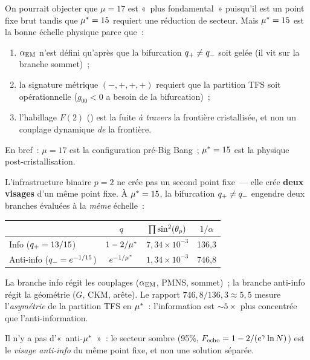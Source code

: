 \documentclass[12pt,a4paper]{article}
\begin{document}
\begin{remarque}[Pourquoi $\mustar = 15$ est le point fixe physique]
\label{rem:why_15}
On pourrait objecter que $\mu = 17$ est «~plus fondamental~» puisqu'il
est un point fixe brut tandis que $\mustar = 15$ requiert une
réduction de secteur. Mais $\mustar = 15$ est la bonne échelle
physique parce que~:
\begin{enumerate}[nosep]
\item $\alpha_{\mathrm{EM}}$ n'est défini qu'après que la bifurcation
  $q_{+} \neq q_{-}$ soit gelée (il vit sur la branche sommet)~;
\item la signature métrique $(-,+,+,+)$ requiert que la partition
  TFS soit opérationnelle ($g_{00} < 0$ a besoin de la bifurcation)~;
\item l'habillage $F(2)$ (\cite{companion_physics}) est la fuite
  \emph{à travers} la frontière cristallisée, et non un couplage
  dynamique \emph{de} la frontière.
\end{enumerate}
En bref~: $\mu = 17$ est la configuration pré-Big Bang~;
$\mustar = 15$ est la physique post-cristallisation.
\end{remarque}

\begin{remarque}[Les deux visages de $\mustar = 15$]
\label{rem:two_faces}
L'infrastructure binaire $p = 2$ ne crée pas un second point fixe~---
elle crée \textbf{deux visages} d'un même point fixe.
À $\mustar = 15$, la bifurcation $q_{+} \neq q_{-}$ engendre
deux branches évaluées à la \emph{même} échelle~:
\begin{center}
\begin{tabular}{lccc}
\toprule
& $q$ & $\prod \sin^2(\theta_{p})$ & $1/\alpha$ \\
\midrule
Info ($q_{+} = 13/15$) & $1 - 2/{\mu^{*}}$ & $7{,}34 \times 10^{-3}$ & 136{,}3 \\
Anti-info ($q_{-} = e^{-1/15}$) & $e^{-1/{\mu^{*}}}$ & $1{,}34 \times 10^{-3}$ & 746{,}8 \\
\bottomrule
\end{tabular}
\end{center}
La branche info régit les couplages ($\alpha_{\mathrm{EM}}$, PMNS, sommet)~;
la branche anti-info régit la géométrie ($G$, CKM, arête).
Le rapport $746{,}8 / 136{,}3 \approx 5{,}5$ mesure l'\emph{asymétrie}
de la partition TFS en ${\mu^{*}}$~: l'information est $\sim 5\times$
plus concentrée que l'anti-information.

Il n'y a pas d'«~anti-${\mu^{*}}$~»~: le secteur sombre (95\%,
$F_{\rm echo} = 1 - 2/(e^\gamma \ln N)$) est le \emph{visage
anti-info} du même point fixe, et non une solution séparée.
\end{remarque}
\end{document}
